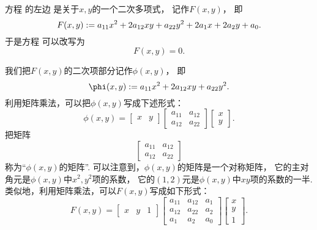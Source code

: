 方程  的左边
是关于\(x,y\)的一个二次多项式，
记作\(F(x,y)\)，
即\begin{equation*}
	F(x,y)
	:=
	a_{11} x^2 + 2 a_{12} x y + a_{22} y^2
	+ 2 a_1 x + 2 a_2 y + a_0.
\end{equation*}
于是方程  可以改写为\begin{equation*}
	F(x,y) = 0.
\end{equation*}

我们把\(F(x,y)\)的二次项部分记作\(\phi(x,y)\)，
即\begin{equation}
	\phi(x,y)
	\defeq
	a_{11} x^2 + 2 a_{12} x y + a_{22} y^2.
\end{equation}
利用矩阵乘法，可以把\(\phi(x,y)\)写成下述形式：\begin{equation}
	\phi(x,y)
	= \begin{bmatrix}
		x & y
	\end{bmatrix}
	\begin{bmatrix}
		a_{11} & a_{12} \\
		a_{12} & a_{22}
	\end{bmatrix}
	\begin{bmatrix}
		x \\ y
	\end{bmatrix}.
\end{equation}
把矩阵\begin{equation}
	\begin{bmatrix}
		a_{11} & a_{12} \\
		a_{12} & a_{22}
	\end{bmatrix}
\end{equation}
称为“\(\phi(x,y)\)的矩阵”.
可以注意到，\(\phi(x,y)\)的矩阵是一个对称矩阵，
它的主对角元是\(\phi(x,y)\)中\(x^2,y^2\)项的系数，
它的\((1,2)\)元是\(\phi(x,y)\)中\(xy\)项的系数的一半.
类似地，利用矩阵乘法，可以\(F(x,y)\)写成如下形式：\begin{equation}
	F(x,y)
	= \begin{bmatrix}
		x & y & 1
	\end{bmatrix}
	\begin{bmatrix}
		a_{11} & a_{12} & a_1 \\
		a_{12} & a_{22} & a_2 \\
		a_1 & a_2 & a_0
	\end{bmatrix}
	\begin{bmatrix}
		x \\ y \\ 1
	\end{bmatrix}.
\end{equation}
